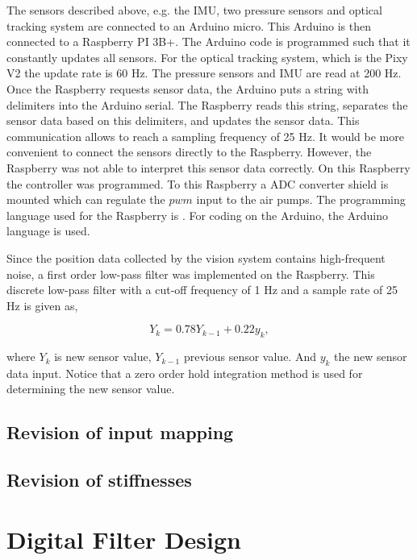 The sensors described above, e.g. the IMU, two pressure sensors and optical tracking system are connected to an Arduino micro. This Arduino is then connected to a Raspberry PI 3B+. The Arduino code is programmed such that it constantly updates all sensors. For the optical tracking system, which is the Pixy V2 the update rate is 60 Hz. The pressure sensors and IMU are read at 200 Hz. Once the Raspberry requests sensor data, the Arduino puts a string with delimiters into the Arduino serial. The Raspberry reads this string, separates the sensor data based on this delimiters, and updates the sensor data. This communication allows to reach a sampling frequency of 25 Hz. It would be more convenient to connect the sensors directly to the Raspberry. However, the Raspberry was not able to interpret this sensor data correctly. On this Raspberry the controller was programmed. To this Raspberry a ADC converter shield is mounted which can regulate the $pwm$ input to the air pumps. The programming language used for the Raspberry is \CC. For coding on the Arduino, the Arduino language is used. 

Since the position data collected by the vision system contains high-frequent noise, a first order low-pass filter was implemented on the Raspberry. This discrete low-pass filter with a cut-off frequency of 1 Hz and a sample rate of 25 Hz is given as,

\begin{equation}
    Y_k = 0.78Y_{k-1} + 0.22y_k,
\end{equation}

where $Y_k$ is new sensor value, $Y_{k-1}$ previous sensor value. And $y_k$ the new sensor data input. Notice that a zero order hold integration method is used for determining the new sensor value. 

\subsection{Revision of input mapping}



\subsection{Revision of stiffnesses}


\section{Digital Filter Design}


